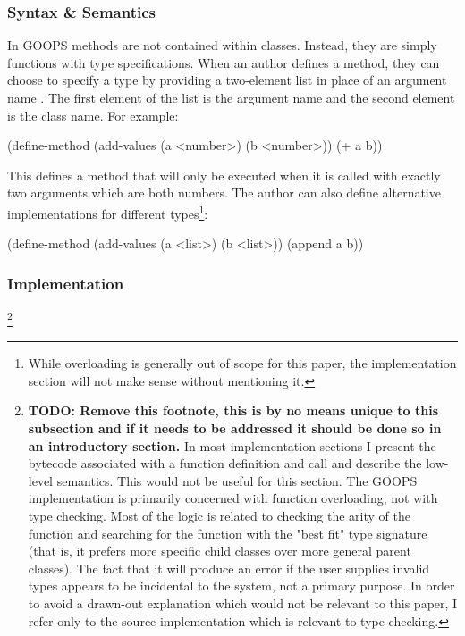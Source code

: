 \subsubsection{Syntax \& Semantics}
In GOOPS methods are not contained within classes.
Instead, they are simply functions with type specifications.
When an author defines a method, they can choose to specify a type by providing a
two-element list in place of an argument name
\parencite[][Section 8.6 "Methods and Generic Functons"]{guile-manual}.
The first element of the list is the argument name and the second element is the class
name.
For example:

\begin{pygmented}[lang=lisp]
(define-method (add-values (a <number>) (b <number>))
  (+ a b))
\end{pygmented}

This defines a method that will only be executed when it is called with exactly two
arguments which are both numbers.
The author can also define alternative implementations for different types\footnote{
	While overloading is generally out of scope for this paper, the implementation section
	will not make sense without mentioning it.
}:

\begin{pygmented}[lang=lisp]
(define-method (add-values (a <list>) (b <list>))
  (append a b))
\end{pygmented}

\subsubsection{Implementation}

\footnote{
	\textbf{TODO: Remove this footnote, this is by no means unique to this subsection and if
	it needs to be addressed it should be done so in an introductory section.}
	In most implementation sections I present the bytecode associated with a function
	definition and call and describe the low-level semantics.
	This would not be useful for this section.
	The GOOPS implementation is primarily concerned with function overloading, not with
	type checking.
	Most of the logic is related to checking the arity of the function and searching for
	the function with the "best fit" type signature (that is, it prefers more specific
	child classes over more general parent classes).
	The fact that it will produce an error if the user supplies invalid types appears to be
	incidental to the system, not a primary purpose.
	In order to avoid a drawn-out explanation which would not be relevant to this paper, I
	refer only to the source implementation which is relevant to type-checking.
}


